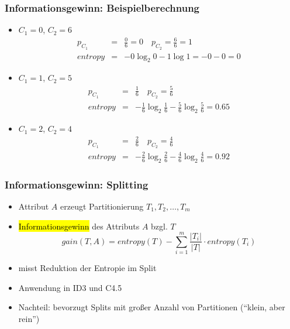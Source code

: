 \begin{frame}
\frametitle{Informationsgewinn: Beispielberechnung}

\begin{itemize}
\item $C_1 = 0$, $C_2 = 6$
\begin{eqnarray*}
p_{C_1}&=&\frac{0}{6} = 0 \quad p_{C_2}=\frac{6}{6}=1\\
\textit{entropy}&=&-0 \log_2 0 - 1 \log 1 = - 0 - 0 = 0
\end{eqnarray*}
\item $C_1 = 1$, $C_2 = 5$
\begin{eqnarray*}
p_{C_1}&=&\frac{1}{6} \quad p_{C_2}=\frac{5}{6}\\
\textit{entropy}&=&-\frac{1}{6}\log_2\frac{1}{6} -
\frac{5}{6}\log_2\frac{5}{6} = 0.65
\end{eqnarray*}
\item $C_1 = 2$, $C_2 = 4$
\begin{eqnarray*}
p_{C_1}&=&\frac{2}{6} \quad p_{C_2}=\frac{4}{6}\\
\textit{entropy}&=&-\frac{2}{6}\log_2\frac{2}{6} -
\frac{4}{6}\log_2\frac{4}{6} = 0.92
\end{eqnarray*}
\end{itemize}
\end{frame}


\begin{frame}
\frametitle{Informationsgewinn: Splitting}

\begin{itemize}
\item Attribut $A$ erzeugt Partitionierung $T_1, T_2, \dots, T_m$
\item \hl{Informationsgewinn} des Attributs $A$ bzgl. $T$
$$
\textit{gain}(T, A)=\textit{entropy}(T) -
\sum_{i=1}^m\frac{|T_i|}{|T|} \cdot \textit{entropy}(T_i)
$$
\item misst Reduktion der Entropie im Split
\item Anwendung in ID3 und C4.5
\item Nachteil: bevorzugt Splits mit großer Anzahl von Partitionen
  ("`klein, aber rein"')
\end{itemize}

\end{frame}


